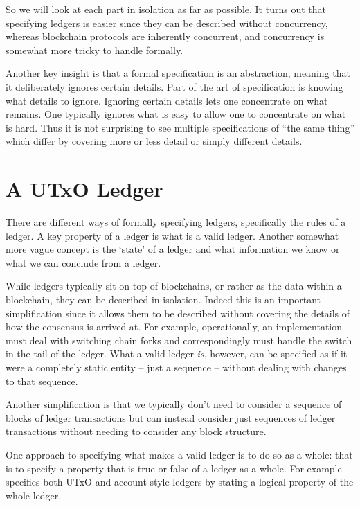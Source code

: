 \documentclass[11pt,a4paper]{article}
\begin{document}
So we will look at each part in isolation as far as possible. It turns out
that specifying ledgers is easier since they can be described without
concurrency, whereas blockchain protocols are inherently concurrent, and
concurrency is somewhat more tricky to handle formally.

Another key insight is that a formal specification is an abstraction, meaning
that it deliberately ignores certain details. Part of the art of specification
is knowing what details to ignore. Ignoring certain details lets one
concentrate on what remains. One typically ignores what is easy to allow one
to concentrate on what is hard. Thus it is not surprising to see multiple
specifications of ``the same thing'' which differ by covering more or less
detail or simply different details.

\section{A UTxO Ledger}

There are different ways of formally specifying ledgers, specifically the rules
of a ledger. A key property of a ledger is what is a valid ledger. Another
somewhat more vague concept is the `state' of a ledger and what information we
know or what we can conclude from a ledger.

While ledgers typically sit on top of blockchains, or rather as the data within
a blockchain, they can be described in isolation. Indeed this is an important
simplification since it allows them to be described without covering the
details of how the consensus is arrived at. For example, operationally, an
implementation must deal with switching chain forks and correspondingly must
handle the switch in the tail of the ledger. What a valid ledger \emph{is},
however, can be specified as if it were a completely static entity -- just a
sequence -- without dealing with changes to that sequence.

Another simplification is that we typically don't need to consider a sequence
of blocks of ledger transactions but can instead consider just sequences of
ledger transactions without needing to consider any block structure.

One approach to specifying what makes a valid ledger is to do so as a whole:
that is to specify a property that is true or false of a ledger as a whole. For
example \citet{utxo_accounting} specifies both UTxO and account style ledgers
by stating a logical property of the whole ledger.
\end{document}
